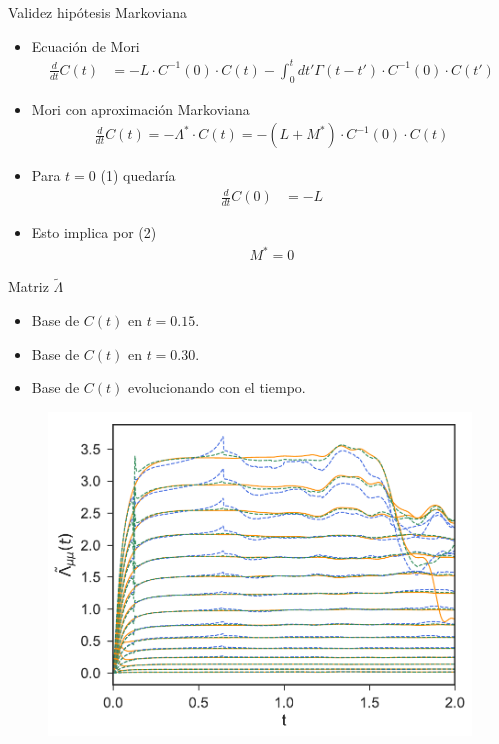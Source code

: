 \documentclass{beamer}
\newcommand{\esc}{\!\cdot\!}
\begin{document}
\begin{frame}{Validez hipótesis Markoviana}
  \begin{itemize}
    \item Ecuación de Mori
\begin{align}
  \frac{d}{dt}C(t)&=-L\esc C^{-1}(0)\esc C(t)
  -\int_0^tdt' \Gamma(t-t')\esc C^{-1}(0)\esc  C(t')
\end{align}
\item Mori con aproximación Markoviana
  \begin{align}
    \frac{d}{dt}C(t)=-\Lambda^*\esc C(t)=-(L+M^*)\esc C^{-1}(0)\esc C(t)
  \end{align}

\item Para $t=0$ (1) quedaría
  \begin{align}
  \frac{d}{dt}C(0)&=-L
    \nonumber
\end{align}

\item Esto implica por (2) 
  \begin{align}
  M^*=0
  \end{align}
\end{itemize}
\end{frame}

\begin{frame}{Matriz $\tilde{\Lambda}$}
  \begin{itemize}
    \item {\color{blue} Base de $C(t)$ en $t=0.15$.}
    \item {\color{green} Base de $C(t)$ en $t=0.30$.}
    \item {\color{orange} Base de $C(t)$ evolucionando con el tiempo.}
  \end{itemize}
  \begin{figure}
    \includegraphics[width=0.7\linewidth]{LambdatBasis-WALLS-66nodes}
  \end{figure}
\end{frame}
\end{document}

